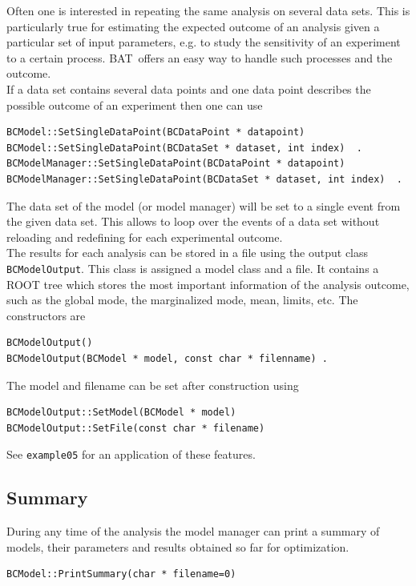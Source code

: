 \documentclass[11pt, a4paper]{article}
\newcommand{\BAT}{{\sc BAT}}
\begin{document}
Often one is interested in repeating the same analysis on several data
sets. This is particularly true for estimating the expected outcome of
an analysis given a particular set of input parameters, e.g. to study
the sensitivity of an experiment to a certain process. \BAT\ offers an
easy way to handle such processes and the outcome. \\ 

If a data set contains several data points and one data point
describes the possible outcome of an experiment then one can use 
%
\begin{verbatim}
BCModel::SetSingleDataPoint(BCDataPoint * datapoint) 
BCModel::SetSingleDataPoint(BCDataSet * dataset, int index)  . 
BCModelManager::SetSingleDataPoint(BCDataPoint * datapoint) 
BCModelManager::SetSingleDataPoint(BCDataSet * dataset, int index)  . 
\end{verbatim} 
%
The data set of the model (or model manager) will be set to a single
event from the given data set. This allows to loop over the events of
a data set without reloading and redefining for each experimental
outcome. \\ 

The results for each analysis can be stored in a file using the output
class \verb|BCModelOutput|. This class is assigned a model class and a
file. It contains a ROOT tree which stores the most important
information of the analysis outcome, such as the global mode, the
marginalized mode, mean, limits, etc. The constructors are 
%
\begin{verbatim}
BCModelOutput() 
BCModelOutput(BCModel * model, const char * filenname) .
\end{verbatim}
%
The model and filename can be set after construction using 
%
\begin{verbatim}
BCModelOutput::SetModel(BCModel * model) 
BCModelOutput::SetFile(const char * filename) 
\end{verbatim}
%
See \verb|example05| for an application of these features. 


\subsection{Summary} 

During any time of the analysis the model manager can print a summary
of models, their parameters and results obtained so far for
optimization. 
%
\begin{verbatim}
BCModel::PrintSummary(char * filename=0)
\end{verbatim} 
\end{document}
